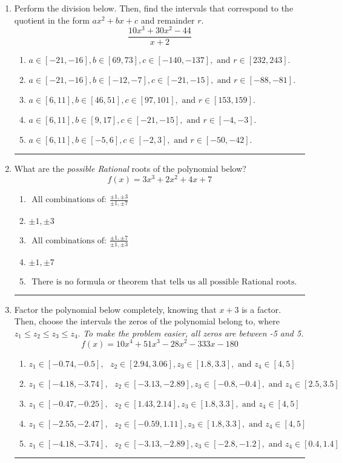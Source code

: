 \documentclass[14pt]{extbook}
\newcommand{\litem}[1]{\item#1\hspace*{-1cm}\rule{\textwidth}{0.4pt}}
\begin{document}
\begin{enumerate}
{\begin{enumerate}[label=\Alph*.]
\end{enumerate} }
\litem{
Perform the division below. Then, find the intervals that correspond to the quotient in the form $ax^2+bx+c$ and remainder $r$.\[ \frac{10x^{3} +30 x^{2} -44}{x + 2} \]\begin{enumerate}[label=\Alph*.]
\item \( a \in [-21, -16], b \in [69, 73], c \in [-140, -137], \text{ and } r \in [232, 243]. \)
\item \( a \in [-21, -16], b \in [-12, -7], c \in [-21, -15], \text{ and } r \in [-88, -81]. \)
\item \( a \in [6, 11], b \in [46, 51], c \in [97, 101], \text{ and } r \in [153, 159]. \)
\item \( a \in [6, 11], b \in [9, 17], c \in [-21, -15], \text{ and } r \in [-4, -3]. \)
\item \( a \in [6, 11], b \in [-5, 6], c \in [-2, 3], \text{ and } r \in [-50, -42]. \)

\end{enumerate} }
\litem{
What are the \textit{possible Rational} roots of the polynomial below?\[ f(x) = 3x^{3} +2 x^{2} +4 x + 7 \]\begin{enumerate}[label=\Alph*.]
\item \( \text{ All combinations of: }\frac{\pm 1,\pm 3}{\pm 1,\pm 7} \)
\item \( \pm 1,\pm 3 \)
\item \( \text{ All combinations of: }\frac{\pm 1,\pm 7}{\pm 1,\pm 3} \)
\item \( \pm 1,\pm 7 \)
\item \( \text{ There is no formula or theorem that tells us all possible Rational roots.} \)

\end{enumerate} }
\litem{
Factor the polynomial below completely, knowing that $x + 3$ is a factor. Then, choose the intervals the zeros of the polynomial belong to, where $z_1 \leq z_2 \leq z_3 \leq z_4$. \textit{To make the problem easier, all zeros are between -5 and 5.}\[ f(x) = 10x^{4} +51 x^{3} -28 x^{2} -333 x -180 \]\begin{enumerate}[label=\Alph*.]
\item \( z_1 \in [-0.74, -0.5], \text{   }  z_2 \in [2.94, 3.06], z_3 \in [1.8, 3.3], \text{   and   } z_4 \in [4, 5] \)
\item \( z_1 \in [-4.18, -3.74], \text{   }  z_2 \in [-3.13, -2.89], z_3 \in [-0.8, -0.4], \text{   and   } z_4 \in [2.5, 3.5] \)
\item \( z_1 \in [-0.47, -0.25], \text{   }  z_2 \in [1.43, 2.14], z_3 \in [1.8, 3.3], \text{   and   } z_4 \in [4, 5] \)
\item \( z_1 \in [-2.55, -2.47], \text{   }  z_2 \in [-0.59, 1.11], z_3 \in [1.8, 3.3], \text{   and   } z_4 \in [4, 5] \)
\item \( z_1 \in [-4.18, -3.74], \text{   }  z_2 \in [-3.13, -2.89], z_3 \in [-2.8, -1.2], \text{   and   } z_4 \in [0.4, 1.4] \)


\end{enumerate}}
\end{enumerate}
\end{document}
